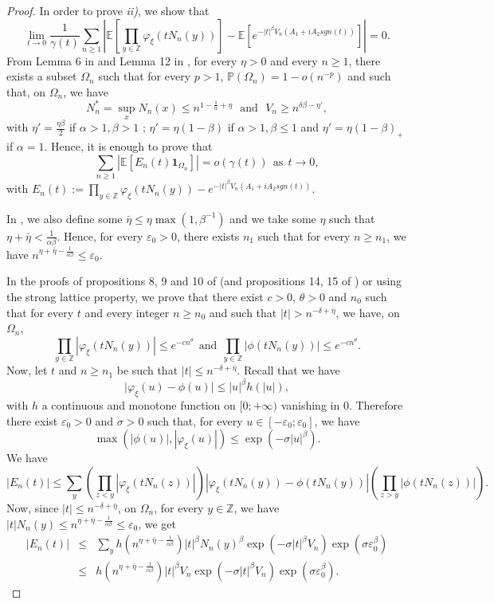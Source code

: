 \documentclass[oneside, a4paper,11pt,reqno]{amsart}
\begin{document}
\begin{proof}
In  order to prove {\it ii)}, we  show that 
$$\lim_{t\rightarrow 0}
 \frac 1{\gamma(t)}
\sum_{n\ge 1} \left| {\mathbb E}\left[\prod_{y\in\mathbb Z}\varphi_\xi(tN_n(y))\right]
 - {\mathbb E}\left[e^{-|t|^\beta V_n(A_1+iA_2 sgn(t))}\right]\right|=0.$$
{}From Lemma 6 in \cite{BFFN} and Lemma 12  in \cite{FFN}, 
for every $\eta>0$ and every $n\ge 1$, there exists a subset 
$\Omega_n$ such that  
for every $p> 1$, $\mathbb{P}(\Omega_n)=1- o(n^{-p})$ and such that, on $\Omega_n$,
we have 
$$N_n^{*} = \sup_x N_n(x) \leq n^{1-\frac 1\alpha +\eta }\ \ \ \mbox{and}\ \ \ 
V_n \geq n^{\delta\beta - \eta'},$$
with $\eta'=\frac{\eta\beta}2$ if $\alpha>1,\beta>1$ ; $\eta'=\eta(1-\beta)$ if 
$\alpha>1,\beta\le 1$ and $\eta'=\eta(1-\beta)_+$ if $\alpha=1$.
Hence, it is enough to prove that
$$\sum_{n\geq 1}\left| {\mathbb E}\left[E_n(t)
{\mathbf 1}_{\Omega_n}  \right]\right| = o(\gamma(t)) \ \ \mbox{as}\ \ t\rightarrow 0,$$
with $E_n(t):=\prod_{y\in\mathbb Z}\varphi_\xi(tN_n(y)) - 
e^{-|t|^\beta V_n(A_1+iA_2 sgn(t))}$.

\noindent In \cite{BFFN,FFN}, we also define some $\bar\eta\le \eta\max(1,\beta^{-1})$ 
and we take some
$\eta$ such that $\eta+\bar\eta<\frac 1{\alpha\beta}$. Hence, for every $\varepsilon_0>0$, there exists $n_1$ such that for every $n\ge n_1$, we have
$n^{\eta+\bar\eta-\frac 1{\alpha\beta}} \le \varepsilon_0$. 

\noindent In the proofs of propositions 8, 9 and 10 of \cite{BFFN} 
(and propositions 14, 15 of \cite{FFN}) or using the strong lattice property, 
we prove that there exist
$c>0$, $\theta>0$ and $n_0$ such that for every $t$ and every integer $n\ge n_0$ and such that 
$|t|>n^{-\delta+\bar\eta}$, we have, on $\Omega_n$,
$$\prod_{y\in\mathbb Z}|\varphi_\xi(tN_n(y))|  \le  e^{-cn^\theta}\ \ 
\mbox{and}\ \ 
\prod_{y\in\mathbb Z}|\phi(tN_n(y))|  \le  e^{-cn^\theta}.$$
Now, let $t$ and $n\ge n_1$ be such that $|t|\le n^{-\delta+\bar\eta}$.
Recall that we have
$$\Big|\varphi_\xi(u)-\phi(u)\Big|\le |u|^\beta h(|u|),$$
with $h$ a continuous and monotone function on $[0;+\infty)$ vanishing in 0.
Therefore there exist $\varepsilon_0>0$ and $\sigma>0$ such that, for every
$u\in[-\varepsilon_0;\varepsilon_0]$, we have
$$\max(|\phi(u)|,|\varphi_\xi(u)|)\le \exp(-\sigma |u|^\beta).$$
We have
$$|E_n(t)| \le
 \sum_y  \left(\prod_{z<y} |\varphi_\xi(tN_n(z))|\right)
\left|\varphi_\xi(tN_n(y))- \phi(tN_n(y)) \right|\left(\prod_{z>y} |\phi(tN_n(z))| \right).
$$ 
Now, since $|t|\le n^{-\delta+\bar\eta}$, on $\Omega_n$, for every $y\in\mathbb Z$,
 we have $|t| N_n(y)\leq
  n^{\eta+\bar\eta-\frac 1{\alpha\beta}} \leq \varepsilon_0$, 
we get
\begin{eqnarray*} 
|E_n(t)|
&\le&  \sum_y   h(n^{\eta+\bar\eta-\frac 1{\alpha\beta}}) |t|^\beta
  N_n(y)^\beta  \exp(-\sigma|t|^\beta V_n) \exp(\sigma\varepsilon_0^{\beta})\\
&\le&   h(n^{\eta+\bar\eta-\frac 1{\alpha\beta}}) |t|^\beta
  V_n  \exp(-\sigma|t|^\beta V_n) \exp(\sigma\varepsilon_0^{\beta}).
\end{eqnarray*}


\end{proof}
\end{document}
